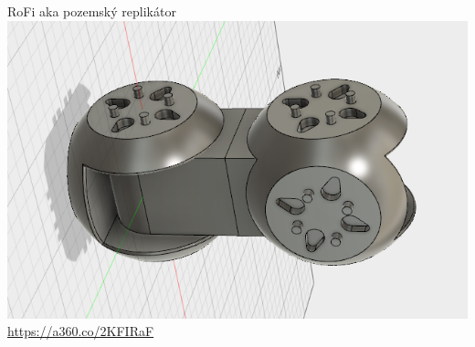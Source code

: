 \documentclass{beamer}
\begin{document}
\begin{frame}{RoFi aka pozemský replikátor}
    \centering
    \includegraphics[width=\textwidth]{img/rofi2}
    \url{https://a360.co/2KFIRaF}
\end{frame}
\end{document}
